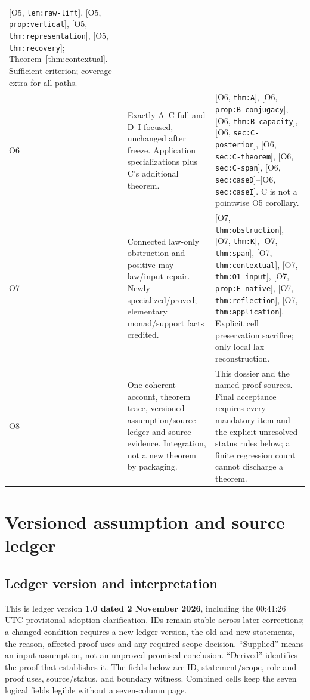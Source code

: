\documentclass[11pt,a4paper]{article}
\theoremstyle{definition}
\newcommand{\Addr}[2]{\textup{[#1, \texttt{#2}]}}
\begin{document}
\begin{longtable}{@{}p{.06\linewidth}p{.37\linewidth}p{.46\linewidth}@{}}
\Addr{O5}{lem:raw-lift}, \Addr{O5}{prop:vertical},
\Addr{O5}{thm:representation}, \Addr{O5}{thm:recovery};
Theorem~\ref{thm:contextual}. Sufficient criterion; coverage extra for all paths.\\
O6&Exactly A--C full and D--I focused, unchanged after freeze. Application
specializations plus C's additional theorem.&\Addr{O6}{thm:A},
\Addr{O6}{prop:B-conjugacy}, \Addr{O6}{thm:B-capacity},
\Addr{O6}{sec:C-posterior}, \Addr{O6}{sec:C-theorem},
\Addr{O6}{sec:C-span}, \Addr{O6}{sec:caseD}--\Addr{O6}{sec:caseI}.
C is not a pointwise O5 corollary.\\
O7&Connected law-only obstruction and positive may-law/input repair.
Newly specialized/proved; elementary monad/support facts credited.&
\Addr{O7}{thm:obstruction}, \Addr{O7}{thm:K},
\Addr{O7}{thm:span}, \Addr{O7}{thm:contextual},
\Addr{O7}{thm:O1-input}, \Addr{O7}{prop:E-native},
\Addr{O7}{thm:reflection}, \Addr{O7}{thm:application}. Explicit cell
preservation sacrifice; only local lax reconstruction.\\
O8&One coherent account, theorem trace, versioned assumption/source ledger
and source evidence. Integration, not a new theorem by packaging.&This
dossier and the named proof sources. Final acceptance requires every
mandatory item and the explicit unresolved-status rules below; a finite
regression count cannot discharge a theorem.\\
\bottomrule
\end{longtable}
\normalsize

\section{Versioned assumption and source ledger}\label{sec:ledger}

\subsection{Ledger version and interpretation}
This is ledger version \textbf{1.0 dated 2 November 2026}, including the
00:41:26 UTC provisional-adoption clarification. IDs remain
stable across later corrections; a changed condition requires a new ledger
version, the old and new statements, the reason, affected proof uses and
any required scope decision. ``Supplied'' means an input assumption,
not an unproved promised conclusion. ``Derived'' identifies the proof
that establishes it. The fields below are ID, statement/scope, role and
proof uses, source/status, and boundary witness. Combined cells keep the
seven logical fields legible without a seven-column page.
\end{document}
